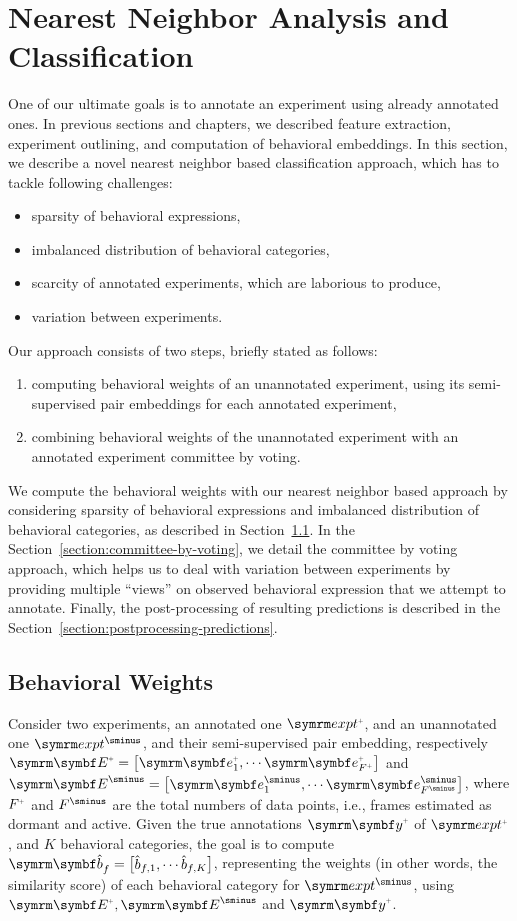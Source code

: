 \section{Nearest Neighbor Analysis and Classification}
One of our ultimate goals is to annotate an experiment using already annotated ones.
In previous sections and chapters, we described feature extraction, experiment outlining, and computation of behavioral embeddings.
In this section, we describe a novel nearest neighbor based classification approach, which has to tackle following challenges:
\begin{itemize}
	\item sparsity of behavioral expressions,
	\item imbalanced distribution of behavioral categories,
	\item scarcity of annotated experiments, which are laborious to produce,
	\item variation between experiments.
\end{itemize}
Our approach consists of two steps, briefly stated as follows:
\begin{enumerate}
	\item computing behavioral weights of an unannotated experiment, using its semi-supervised pair embeddings for each annotated  experiment,
	\item combining behavioral weights of the unannotated experiment with an annotated experiment committee by voting.
\end{enumerate}
We compute the behavioral weights with our nearest neighbor based approach by considering sparsity of behavioral expressions and imbalanced distribution of behavioral categories, as described in Section~\ref{section:behavioral-weights}.
In the Section~\ref{section:committee-by-voting}, we detail the committee by voting approach, which helps us to deal with variation between experiments by providing multiple ``views'' on observed behavioral expression that we attempt to annotate. Finally, the post-processing of resulting predictions is described in the Section~\ref{section:postprocessing-predictions}.

\subsection{Behavioral Weights}\label{section:behavioral-weights}
Consider two experiments, an annotated one $\exptAnn$, and an unannotated one $\exptUnann$, and their semi-supervised pair embedding, respectively $\Ann{\V{E}}=\qmatrix{\Ann{\V{e}}_1, \cdots \Ann{\V{e}_{\Ann{F}}}}$ and $\Unann{\V{E}}=\qmatrix{\Unann{\V{e}}_1, \cdots \Unann{\V{e}}_{\Unann{F}}}$, where $\Ann{F}$ and $\Unann{F}$ are the total numbers of data points, i.e., frames estimated as dormant and active.
Given the true annotations $\Ann{\V{y}}$ of $\exptAnn$, and $K$ behavioral categories, the goal is to compute $\V{\hat{b}}_f=\qmatrix{\hat{b}_{f,1}, \cdots \hat{b}_{f,K}}$, representing the weights (in other words, the similarity score) of each behavioral category for $\exptUnann$, using $\Ann{\V{E}}, \Unann{\V{E}}$ and $\Ann{\V{y}}$.

